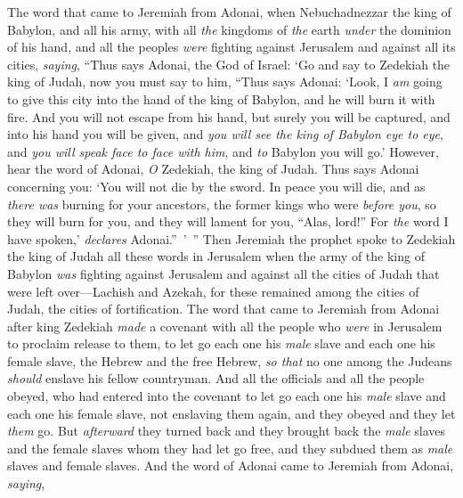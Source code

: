 \begin{biblechapter} %
 The word that came to Jeremiah from Adonai, when Nebuchadnezzar the king of Babylon, and all his army, with all \textit{the} kingdoms of \textit{the} earth \textit{under} the dominion of his hand, and all the peoples \textit{were} fighting against Jerusalem and against all its cities, \textit{saying},
\verse “Thus says Adonai, the God of Israel: ‘Go and say to Zedekiah the king of Judah, now you must say to him, “Thus says Adonai: ‘Look, I \textit{am} going to give this city into the hand of the king of Babylon, and he will burn it with fire.
\verse And you will not escape from his hand, but surely you will be captured, and into his hand you will be given, and \textit{you will see the king of Babylon eye to eye}, and \textit{you will speak face to face with him}, and \textit{to} Babylon you will go.’
\verse However, hear the word of Adonai, \textit{O} Zedekiah, the king of Judah. Thus says Adonai concerning you: ‘You will not die by the sword.
\verse In peace you will die, and as \textit{there was} burning for your ancestors, the former kings who were \textit{before you}, so they will burn for you, and they will lament for you, “Alas, lord!” For \textit{the} word I have spoken,’ \textit{declares} Adonai.” ’ ”
\verse Then Jeremiah the prophet spoke to Zedekiah the king of Judah all these words in Jerusalem
\verse when the army of the king of Babylon \textit{was} fighting against Jerusalem and against all the cities of Judah that were left over—Lachish and Azekah, for these remained among the cities of Judah, the cities of fortification.
 The word that came to Jeremiah from Adonai after king Zedekiah \textit{made} a covenant with all the people who \textit{were} in Jerusalem to proclaim release to them,
\verse to let go each one his \textit{male} slave and each one his female slave, the Hebrew and the free Hebrew, \textit{so that} no one among the Judeans \textit{should} enslave his fellow countryman.
\verse And all the officials and all the people obeyed, who had entered into the covenant to let go each one his \textit{male} slave and each one his female slave, not enslaving them again, and they obeyed and they let \textit{them} go.
\verse But \textit{afterward} they turned back and they brought back the \textit{male} slaves and the female slaves whom they had let go free, and they subdued them as \textit{male} slaves and female slaves.
\verse And the word of Adonai came to Jeremiah from Adonai, \textit{saying},

\end{biblechapter}
